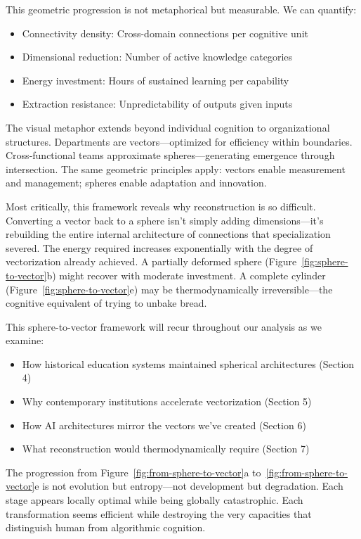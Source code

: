 This geometric progression is not metaphorical but measurable. We can quantify:
\begin{itemize}
\item Connectivity density: Cross-domain connections per cognitive unit
\item Dimensional reduction: Number of active knowledge categories
\item Energy investment: Hours of sustained learning per capability
\item Extraction resistance: Unpredictability of outputs given inputs
\end{itemize}

The visual metaphor extends beyond individual cognition to organizational structures. Departments are vectors---optimized for efficiency within boundaries. Cross-functional teams approximate spheres---generating emergence through intersection. The same geometric principles apply: vectors enable measurement and management; spheres enable adaptation and innovation.

Most critically, this framework reveals why reconstruction is so difficult. Converting a vector back to a sphere isn't simply adding dimensions---it's rebuilding the entire internal architecture of connections that specialization severed. The energy required increases exponentially with the degree of vectorization already achieved. A partially deformed sphere (Figure~\ref{fig:sphere-to-vector}b) might recover with moderate investment. A complete cylinder (Figure~\ref{fig:sphere-to-vector}e) may be thermodynamically irreversible---the cognitive equivalent of trying to unbake bread.

This sphere-to-vector framework will recur throughout our analysis as we examine:
\begin{itemize}
\item How historical education systems maintained spherical architectures (Section 4)
\item Why contemporary institutions accelerate vectorization (Section 5)
\item How AI architectures mirror the vectors we've created (Section 6)
\item What reconstruction would thermodynamically require (Section 7)
\end{itemize}

The progression from Figure~\ref{fig:from-sphere-to-vector}a to~\ref{fig:from-sphere-to-vector}e is not evolution but entropy---not development but degradation. Each stage appears locally optimal while being globally catastrophic. Each transformation seems efficient while destroying the very capacities that distinguish human from algorithmic cognition.

